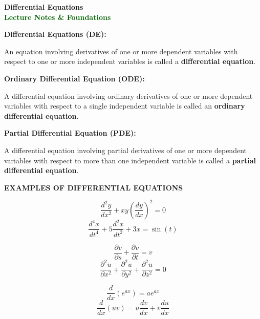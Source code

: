 \documentclass[11pt,a4paper]{article}
\newcommand{\Heading}[1]{\vspace{0.3cm}\noindent\textbf{\textcolor{AcademicGreen}{\large #1}}\par\vspace{0.15cm}}
\begin{document}
\begin{center}
    {\LARGE\bfseries\textcolor{AcademicGreen}{Differential Equations}} \\[0.2cm]
    {\small\textcolor{DarkGreen}{\textbf{Lecture Notes \& Foundations}}}
    \vspace{0.4cm}
\end{center}

\Heading{Differential Equations (DE):}
An equation involving derivatives of one or more dependent variables with respect to one or more independent variables is called a \textbf{differential equation}.

\Heading{Ordinary Differential Equation (ODE):}
A differential equation involving ordinary derivatives of one or more dependent variables with respect to a single independent variable is called an \textbf{ordinary differential equation}.

\Heading{Partial Differential Equation (PDE):}
A differential equation involving partial derivatives of one or more dependent variables with respect to more than one independent variable is called a \textbf{partial differential equation}.

\vspace{0.4cm}
\begin{tcolorbox}[greenbox]
    {\small\textbf{\textcolor{AcademicGreen}{EXAMPLES OF DIFFERENTIAL EQUATIONS}}}
    \vspace{0.2cm}
    \begin{description}[leftmargin=0.4cm, style=nextline, font=\normalfont\bfseries\textcolor{DarkGreen}]
        \item[Ordinary Differential Equations (ODE)]
        \[ \frac{d^2y}{dx^2} + xy\left(\frac{dy}{dx}\right)^2 = 0 \]
        \[ \frac{d^4x}{dt^4} + 5\frac{d^2x}{dt^2} + 3x = \sin(t) \]
        \item[Partial Differential Equations (PDE)]
        \[ \frac{\partial v}{\partial s} + \frac{\partial v}{\partial t} = v \]
        \[ \frac{\partial^2 u}{\partial x^2} + \frac{\partial^2 u}{\partial y^2} + \frac{\partial^2 u}{\partial z^2} = 0 \]
        
        \item[Basic Derivatives (Not Differential Equations)]
        \[ \frac{d}{dx}\left(e^{ax}\right) = ae^{ax} \]
        \[ \frac{d}{dx}(uv) = u\frac{dv}{dx} + v\frac{du}{dx} \]
    \end{description}
\end{tcolorbox}
\end{document}
